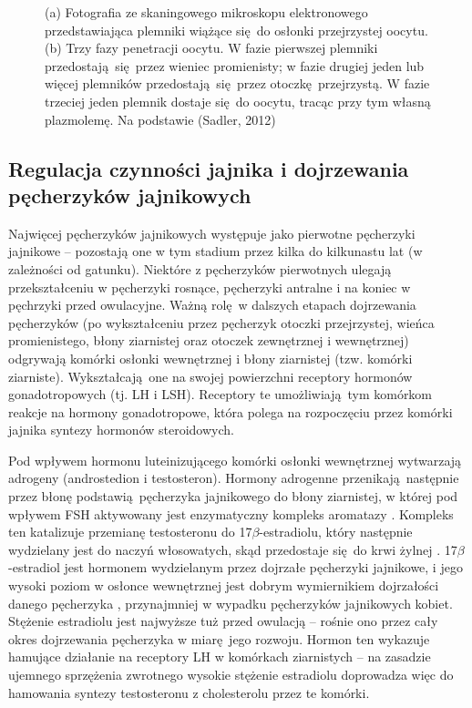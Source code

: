 \documentclass[two column, twoside, a4paper]{article}
\begin{document}
\begin{figure}[bp]
\begin{tcolorbox}
\begin{subfigure}[b]{0.5925\textwidth}
		\caption{}\label{fig::fertilization:b}
		\end{subfigure}
		 \caption{(a) Fotografia ze skaningowego mikroskopu elektronowego przedstawiająca plemniki wiążące się do osłonki przejrzystej oocytu. (b) Trzy fazy penetracji oocytu. W fazie pierwszej plemniki przedostają się przez wieniec promienisty; w fazie drugiej jeden lub więcej plemników przedostają się przez otoczkę przejrzystą. W fazie trzeciej jeden plemnik dostaje się do oocytu, tracąc przy tym własną plazmolemę. Na podstawie (Sadler, 2012)}\label{fig::fertilization}
	\end{tcolorbox}
\end{figure}

\subsection{Regulacja czynności jajnika i dojrzewania pęcherzyków jajnikowych}

Najwięcej pęcherzyków jajnikowych występuje jako pierwotne pęcherzyki jajnikowe -- pozostają one w tym stadium przez kilka do kilkunastu lat (w zależności od gatunku). Niektóre z pęcherzyków pierwotnych ulegają przekształceniu w pęcherzyki rosnące, pęcherzyki antralne i na koniec w pęchrzyki przed owulacyjne. Ważną rolę w dalszych etapach dojrzewania pęcherzyków (po wykształceniu przez pęcherzyk otoczki przejrzystej, wieńca promienistego, błony ziarnistej oraz otoczek zewnętrznej i wewnętrznej) odgrywają komórki osłonki wewnętrznej i błony ziarnistej (tzw. komórki ziarniste). Wykształcają one na swojej powierzchni receptory hormonów gonadotropowych (tj. LH i LSH). Receptory te umożliwiają tym komórkom reakcje na hormony gonadotropowe, która polega na rozpoczęciu przez komórki jajnika syntezy hormonów steroidowych. \autocite{Krzymowski2005}

Pod wpływem hormonu luteinizującego komórki osłonki wewnętrznej wytwarzają adrogeny (androstedion i testosteron). Hormony adrogenne przenikają następnie przez błonę podstawią pęcherzyka jajnikowego do błony ziarnistej, w której pod wpływem FSH aktywowany jest enzymatyczny kompleks aromatazy \autocite{Erickson1978}. Kompleks ten katalizuje przemianę testosteronu do 17$\beta$-estradiolu, który następnie wydzielany jest do naczyń włosowatych, skąd przedostaje się do krwi żylnej \autocite{Abubakar1971}. 17$\beta$-estradiol jest hormonem wydzielanym przez dojrzałe pęcherzyki jajnikowe, i jego wysoki poziom w osłonce wewnętrznej jest dobrym wymiernikiem dojrzałości danego pęcherzyka \autocite{Thorneycroft1971}, przynajmniej w wypadku pęcherzyków jajnikowych kobiet. Stężenie estradiolu jest najwyższe tuż przed owulacją -- rośnie ono przez cały okres dojrzewania pęcherzyka w miarę jego rozwoju. Hormon ten wykazuje hamujące działanie na receptory LH w komórkach ziarnistych -- na zasadzie ujemnego sprzężenia zwrotnego wysokie stężenie estradiolu doprowadza więc do hamowania syntezy testosteronu z cholesterolu przez te komórki.
\end{document}
